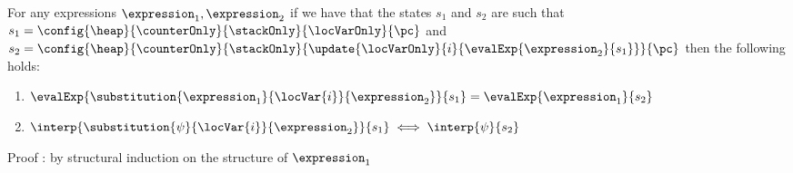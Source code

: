 \begin{substLv}\label{substLv}
For any expressions $ \expression_1, \expression_2 $ 
if we have that the states $s_1$ and $s_2$ are such that
$ s_1 =   \config{\heap}{\counterOnly}{ \stackOnly }{\locVarOnly}{\pc }$ and 
$ s_2 =   \config{\heap}{\counterOnly }{ \stackOnly }{\update{\locVarOnly}{i}{ \evalExp{ \expression_2}{ s_1 } }}{\pc }  $ then 
the following holds:
\begin{enumerate}
      \item $\evalExp{\substitution{\expression_1}{ \locVar{i} }{ \expression_2 }}{ s_1 } = \evalExp{\expression_1}{s_2} $
      \item $\interp{\substitution{\psi}{ \locVar{i} }{ \expression_2 }}{ s_1 } \iff \interp{\psi}{s_2} $
\end{enumerate}
\end{substLv}
Proof : by structural induction on the structure of $\expression_1$ 
